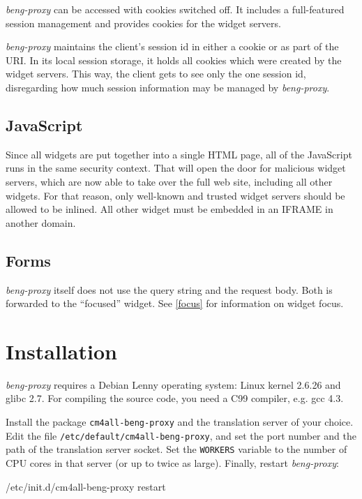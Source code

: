 \documentclass[a4paper,12pt]{article}
\begin{document}
\emph{beng-proxy} can be accessed with cookies switched off.  It includes a
full-featured session management and provides cookies for the widget
servers.

\emph{beng-proxy} maintains the client's session id in either a cookie
or as part of the URI.  In its local session storage, it holds all
cookies which were created by the widget servers.  This way, the
client gets to see only the one session id, disregarding how much
session information may be managed by \emph{beng-proxy}.


\subsection{JavaScript}

Since all widgets are put together into a single HTML page, all of the
JavaScript runs in the same security context.  That will open the door
for malicious widget servers, which are now able to take over the full
web site, including all other widgets.  For that reason, only
well-known and trusted widget servers should be allowed to be inlined.
All other widget must be embedded in an IFRAME in another domain.


\subsection{Forms}

\emph{beng-proxy} itself does not use the query string and the request
body.  Both is forwarded to the ``focused'' widget.  See \ref{focus}
for information on widget focus.


\section{Installation}

\emph{beng-proxy} requires a Debian Lenny operating system: Linux
kernel 2.6.26 and glibc 2.7.  For compiling the source code, you need
a C99 compiler, e.g. gcc 4.3.

Install the package \texttt{cm4all-beng-proxy} and the translation
server of your choice.  Edit the file
\texttt{/etc/default/cm4all-beng-proxy}, and set the port number and
the path of the translation server socket.  Set the \texttt{WORKERS}
variable to the number of CPU cores in that server (or up to twice as
large).  Finally, restart \emph{beng-proxy}:

\begin{verbatim*}
/etc/init.d/cm4all-beng-proxy restart
\end{verbatim*}
\end{document}
